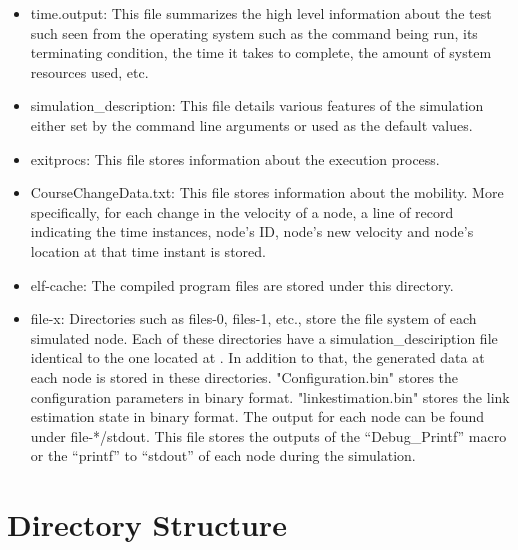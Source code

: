 \begin{itemize}
	\item time.output: This file summarizes the high level information about the test such seen from the operating system such as the command being run, its terminating condition, the time it takes to complete, the amount of system resources used, etc. 
	\item simulation\_description: This file details various features of the simulation either set by the command line arguments or used as the default values. 
	\item exitprocs: This file stores information about the execution process. 
	\item CourseChangeData.txt: This file stores information about the mobility. More specifically, for each change in the velocity of a node, a line of record indicating the time instances, node's ID, node's new velocity and node's location at that time instant is stored.
	\item elf-cache: The compiled program files are stored under this directory. 
	\item file-x: Directories such as files-0, files-1, etc., store the file system of each simulated node. 
	Each of these directories have a simulation\_desciription file identical to the one located at . 
	In addition to that, the generated data at each node is stored in these directories.  
	"Configuration.bin" stores the configuration parameters in binary format.
	"linkestimation.bin" stores the link estimation state in binary format. 
	The output for each node can be found under file-*/stdout. 
	This file stores the outputs of the ``Debug\_Printf'' macro or the ``printf'' to ``stdout'' of each node during the simulation. 	
\end{itemize}

\section{Directory Structure}

